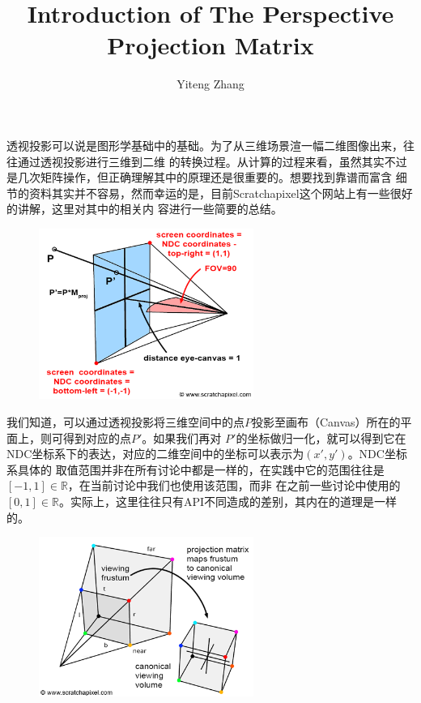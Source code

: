 \documentclass[12pt]{article}
\title{Introduction of The Perspective Projection Matrix}
\author{Yiteng Zhang}
\begin{document}
\maketitle

\indent{}透视投影可以说是图形学基础中的基础。为了从三维场景渲一幅二维图像出来，往往通过透视投影进行三维到二维
的转换过程。从计算的过程来看，虽然其实不过是几次矩阵操作，但正确理解其中的原理还是很重要的。想要找到靠谱而富含
细节的资料其实并不容易，然而幸运的是，目前Scratchapixel这个网站上有一些很好的讲解，这里对其中的相关内
容进行一些简要的总结。

\begin{figure}[h]
\centering
\includegraphics[width=7cm]{./imgs/perspprojmatrix2.png}
\end{figure}

\indent{}我们知道，可以通过透视投影将三维空间中的点$P$投影至画布（Canvas）所在的平面上，则可得到对应的点$P'$。如果我们再对%
$P'$的坐标做归一化，就可以得到它在NDC坐标系下的表达，对应的二维空间中的坐标可以表示为$(x',y')$。NDC坐标系具体的
取值范围并非在所有讨论中都是一样的，在实践中它的范围往往是$[-1,1]\in \mathbb{R}$，在当前讨论中我们也使用该范围，而非
在之前一些讨论中使用的$[0,1]\in \mathbb{R}$。实际上，这里往往只有API不同造成的差别，其内在的道理是一样的。

\begin{figure}[h]
\centering
\includegraphics[width=7cm]{./imgs/canonical1.png}
\end{figure}
\end{document}
